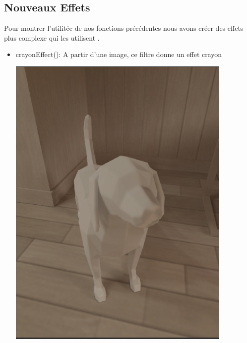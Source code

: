 \documentclass[12pt]{article}
\begin{document}
\begin{itemize}
    
    \end{itemize}

\subsection{Nouveaux Effets}

Pour montrer l'utilitée de nos fonctions précédentes nous avons créer des effets plus complexe qui les utilisent .
\begin{itemize}
    \item crayonEffect():
    A partir d'une image, ce filtre donne un effet crayon

    \includegraphics{dog_original}


\end{itemize}
\end{document}
